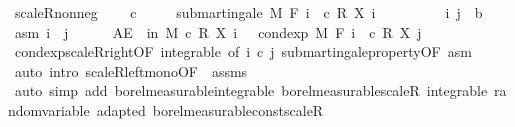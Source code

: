 \begin{isabellebody}
\isamarkupfalse%
%
\endisatagproof
{\isafoldproof}%
%
\isadelimproof
\isanewline
%
\endisadelimproof
\isanewline
{}\isamarkupfalse%
\ scaleR{\isacharunderscore}{\kern0pt}nonneg{\isacharcolon}{\kern0pt}\ \isanewline
\ \ \ {\isachardoublequoteopen}c\ {\isasymge}\ {}{\isachardoublequoteclose}\isanewline
\ \ \ {\isachardoublequoteopen}submartingale\ M\ F\ {\isacharparenleft}{\kern0pt}{\isasymlambda}i\ {\isasymxi}{\isachardot}{\kern0pt}\ c\ {\isacharasterisk}{\kern0pt}\isactrlsub R\ X\ i\ {\isasymxi}{\isacharparenright}{\kern0pt}{\isachardoublequoteclose}\isanewline
%
\isadelimproof
%
\endisadelimproof
%
\isatagproof
{}\isamarkupfalse%
\isanewline
\ \ \isacommand{{\isacharbraceleft}{\kern0pt}}\isamarkupfalse%
\isanewline
\ \ \ \ \isamarkupfalse%
\ i\ j\ {\isacharcolon}{\kern0pt}{\isacharcolon}{\kern0pt}\ {\isacharprime}{\kern0pt}b\ \isamarkupfalse%
\ asm{\isacharcolon}{\kern0pt}\ {\isachardoublequoteopen}i\ {\isasymle}\ j{\isachardoublequoteclose}\isanewline
\ \ \ \ \isamarkupfalse%
\ {\isachardoublequoteopen}AE\ {\isasymxi}\ in\ M{\isachardot}{\kern0pt}\ c\ {\isacharasterisk}{\kern0pt}\isactrlsub R\ X\ i\ {\isasymxi}\ {\isasymle}\ cond{\isacharunderscore}{\kern0pt}exp\ M\ {\isacharparenleft}{\kern0pt}F\ i{\isacharparenright}{\kern0pt}\ {\isacharparenleft}{\kern0pt}{\isasymlambda}{\isasymxi}{\isachardot}{\kern0pt}\ c\ {\isacharasterisk}{\kern0pt}\isactrlsub R\ X\ j\ {\isasymxi}{\isacharparenright}{\kern0pt}\ {\isasymxi}{\isachardoublequoteclose}\ \ \isanewline
\ \ \ \ \ \ \isamarkupfalse%
\ cond{\isacharunderscore}{\kern0pt}exp{\isacharunderscore}{\kern0pt}scaleR{\isacharunderscore}{\kern0pt}right{\isacharbrackleft}{\kern0pt}OF\ integrable{\isacharcomma}{\kern0pt}\ of\ i\ {\isachardoublequoteopen}c{\isachardoublequoteclose}\ j{\isacharbrackright}{\kern0pt}\ submartingale{\isacharunderscore}{\kern0pt}property{\isacharbrackleft}{\kern0pt}OF\ asm{\isacharbrackright}{\kern0pt}\ \isamarkupfalse%
\ {\isacharparenleft}{\kern0pt}auto\ intro{\isacharbang}{\kern0pt}{\isacharcolon}{\kern0pt}\ scaleR{\isacharunderscore}{\kern0pt}left{\isacharunderscore}{\kern0pt}mono{\isacharbrackleft}{\kern0pt}OF\ {\isacharunderscore}{\kern0pt}\ assms{\isacharbrackright}{\kern0pt}{\isacharparenright}{\kern0pt}\isanewline
\ \ \isacommand{{\isacharbraceright}{\kern0pt}}\isamarkupfalse%
\isanewline
{}\isamarkupfalse%
\ {\isacharparenleft}{\kern0pt}auto\ simp\ add{\isacharcolon}{\kern0pt}\ borel{\isacharunderscore}{\kern0pt}measurable{\isacharunderscore}{\kern0pt}integrable\ borel{\isacharunderscore}{\kern0pt}measurable{\isacharunderscore}{\kern0pt}scaleR\ integrable\ random{\isacharunderscore}{\kern0pt}variable\ adapted\ borel{\isacharunderscore}{\kern0pt}measurable{\isacharunderscore}{\kern0pt}const{\isacharunderscore}{\kern0pt}scaleR{\isacharparenright}{\kern0pt}%

\end{isabellebody}
